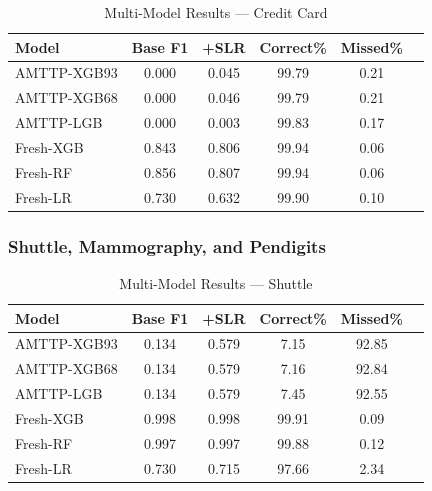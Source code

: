 \documentclass[journal]{IEEEtran}
\begin{document}
\begin{table}[!t]
\centering
\caption{Multi-Model Results --- Credit Card}
\label{tab:multi_credit}
\setlength{\tabcolsep}{3pt}
\begin{tabular}{@{}lccccc@{}}
\toprule
\textbf{Model} & \textbf{Base F1} & \textbf{+SLR} & \textbf{Correct\%} & \textbf{Missed\%} \\
\midrule
AMTTP-XGB93  & 0.000 & 0.045 & 99.79 & 0.21 \\
AMTTP-XGB68  & 0.000 & 0.046 & 99.79 & 0.21 \\
AMTTP-LGB    & 0.000 & 0.003 & 99.83 & 0.17 \\
Fresh-XGB    & 0.843 & 0.806 & 99.94 & 0.06 \\
Fresh-RF     & 0.856 & 0.807 & 99.94 & 0.06 \\
Fresh-LR     & 0.730 & 0.632 & 99.90 & 0.10 \\
\bottomrule
\end{tabular}
\end{table}

\subsubsection{Shuttle, Mammography, and Pendigits}

\begin{table}[!t]
\centering
\caption{Multi-Model Results --- Shuttle}
\label{tab:multi_shuttle}
\setlength{\tabcolsep}{3pt}
\begin{tabular}{@{}lccccc@{}}
\toprule
\textbf{Model} & \textbf{Base F1} & \textbf{+SLR} & \textbf{Correct\%} & \textbf{Missed\%} \\
\midrule
AMTTP-XGB93 & 0.134 & 0.579 & 7.15  & 92.85 \\
AMTTP-XGB68 & 0.134 & 0.579 & 7.16  & 92.84 \\
AMTTP-LGB   & 0.134 & 0.579 & 7.45  & 92.55 \\
Fresh-XGB   & 0.998 & 0.998 & 99.91 & 0.09 \\
Fresh-RF    & 0.997 & 0.997 & 99.88 & 0.12 \\
Fresh-LR    & 0.730 & 0.715 & 97.66 & 2.34 \\
\bottomrule
\end{tabular}
\end{table}
\end{document}
